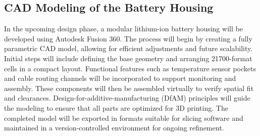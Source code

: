 \subsection*{ CAD Modeling of the Battery Housing}

In the upcoming design phase, a modular lithium-ion battery housing will be developed using Autodesk Fusion 360. The process will begin by creating a fully parametric CAD model, allowing for efficient adjustments and future scalability. Initial steps will include defining the base geometry and arranging 21700-format cells in a compact layout. Functional features such as temperature sensor pockets and cable routing channels will be incorporated to support monitoring and assembly. These components will then be assembled virtually to verify spatial fit and clearances. Design-for-additive-manufacturing (DfAM) principles will guide the modeling to ensure that all parts are optimized for 3D printing. The completed model will be exported in formats suitable for slicing software and maintained in a version-controlled environment for ongoing refinement.





	
